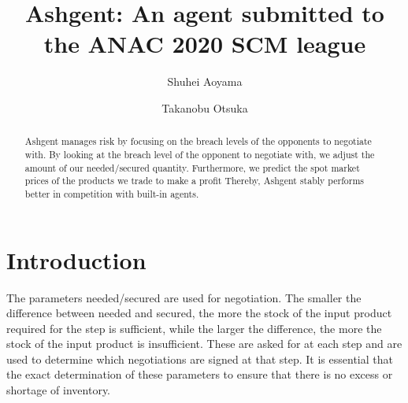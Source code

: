 \documentclass[10pt]{article}
\title{Ashgent: An agent submitted to the ANAC 2020 SCM league}
\author[1]{Shuhei Aoyama}
\author[2]{Takanobu Otsuka}
\affil[1,2]{Nagoya Institute of Technology, Aichi, Japan}
\affil[1]{aoyama.shuhei@otsukalab.nitech.ac.jp}
\affil[2]{otsuka.takanobu@otsukalab.nitech.ac.jp}
\begin{document}
\maketitle
\begin{abstract}

Ashgent manages risk by focusing on the breach levels of the opponents to negotiate with.
By looking at the breach level of the opponent to negotiate with, we adjust the amount of our needed/secured quantity.
Furthermore, we predict the spot market prices of the products we trade to make a profit
Thereby, Ashgent stably performs better in competition with built-in agents.
\end{abstract}


\section{Introduction}
The parameters needed/secured are used for negotiation.
The smaller the difference between needed and secured, the more the stock of the input product required for the step is sufficient, while the larger the difference, the more the stock of the input product is insufficient.
These are asked for at each step and are used to determine which negotiations are signed at that step.
It is essential that the exact determination of these parameters to ensure that there is no excess or shortage of inventory.
\end{document}
